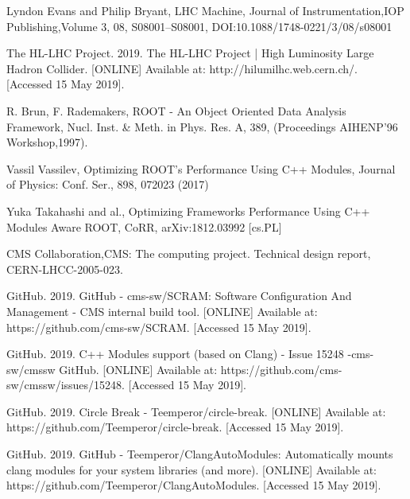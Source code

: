 \documentclass[12pt]{iopart}
\begin{document}
\begin{thebibliography}{10}

Lyndon Evans and Philip Bryant, LHC Machine, Journal of Instrumentation,IOP Publishing,Volume 3, 08, S08001--S08001, DOI:10.1088/1748-0221/3/08/s08001

The HL-LHC Project. 2019. The HL-LHC Project | High Luminosity Large Hadron Collider. [ONLINE] Available at: http://hilumilhc.web.cern.ch/. [Accessed 15 May 2019]. 

R. Brun, F. Rademakers, ROOT - An Object Oriented Data Analysis Framework, Nucl. Inst. \& Meth. in Phys. Res. A, 389, (Proceedings AIHENP'96 Workshop,1997).

Vassil Vassilev, Optimizing ROOT's Performance Using C++ Modules, Journal of Physics: Conf. Ser., 898, 072023 (2017)

Yuka Takahashi and al., Optimizing Frameworks Performance Using C++ Modules Aware ROOT, CoRR, arXiv:1812.03992 [cs.PL]

CMS Collaboration,CMS: The computing project. Technical design report, CERN-LHCC-2005-023.

GitHub. 2019. GitHub - cms-sw/SCRAM: Software Configuration And Management - CMS internal build tool. [ONLINE] Available at: https://github.com/cms-sw/SCRAM. [Accessed 15 May 2019]. 

GitHub. 2019. C++ Modules support (based on Clang) - Issue 15248 -cms-sw/cmssw GitHub. [ONLINE] Available at: https://github.com/cms-sw/cmssw/issues/15248. [Accessed 15 May 2019]. 

GitHub. 2019. Circle Break - Teemperor/circle-break. [ONLINE] Available at: https://github.com/Teemperor/circle-break. [Accessed 15 May 2019]. 

GitHub. 2019. GitHub - Teemperor/ClangAutoModules: Automatically mounts clang modules for your system libraries (and more). [ONLINE] Available at: https://github.com/Teemperor/ClangAutoModules. [Accessed 15 May 2019]. 

\end{thebibliography}
\end{document}
